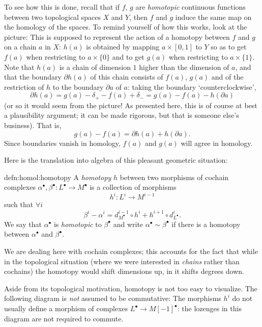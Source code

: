 To see how this is done, recall that if $f$, $g$ are \emph{homotopic}
continuous functions between two topological spaces $X$ and $Y$, then
$f$ and $g$ induce the same map on the homology of the spaces.  To
remind yourself of how this works, look at the picture:
This is supposed to represent the action of a homotopy between $f$ and
$g$ on a chain $a$ in $X$: $h(a)$ is obtained by mapping
$a \times [0,1]$ to $Y$ so as to get $f(a)$ when restricting to
$a \times \{0\}$ and to get $g(a)$ when restricting to
$a \times \{1\}$. Note that $h(a)$ is a chain of dimension $1$ higher
than the dimension of $a$, and that the boundary $\partial h(a)$ of
this chain consists of $f(a)$, $g(a)$ and of the restriction of $h$ to
the boundary $\partial a$ of $a$: taking the boundary
`counterclockwise',
\[
  \partial h(a) = g(a) - \delta_+ - f(a) + \delta_- = g(a) - f(a) -
  h(\partial a)
\]
(or so it would seem from the picture! As presented here, this is of
course at best a plausibility argument; it can be made rigorous, but
that is someone else's business). That is,
\[
  g(a) - f(a) = \partial h(a) + h(\partial a).
\]
Since boundaries vanish in homology, $f(a)$ and $g(a)$ will agree in
homology.

Here is the translation into algebra of this pleasant geometric
situation:

\begin{defn}{}{defn:homol:homotopy}
  A \emph{homotopy} $h$ between two morphisms of cochain complexes
  $\alpha^\bullet, \beta^\bullet : L^\bullet \to M^\bullet$ is a
  collection of morphisms
  \[
    h^i : L^i \to M^{i-1}
  \]
  such that $\forall i$
  \[
    \beta^i - \alpha^i = d^{i-1}_{M^\bullet} \circ h^i + h^{i+1} \circ
    d^i_{L^\bullet}.
  \]
  We say that $\alpha^\bullet$ is \emph{homotopic} to $\beta^\bullet$
  and write $\alpha^\bullet \sim \beta^\bullet$ if there is a homotopy
  between $\alpha^\bullet$ and $\beta^\bullet$.
\end{defn}

We are dealing here with cochain complexes; this accounts for the fact
that while in the topological situation (where we were interested in
\emph{chains} rather than cochains) the homotopy would shift
dimensions up, in  it shifts degrees down.

Aside from its topological motivation, homotopy is not too easy to
visualize. The following diagram is \emph{not} assumed to be
commutative:
The morphisms $h^i$ do not usually define a morphism of complexes
$L^\bullet \to M[-1]^\bullet$: the lozenges in this diagram are not
required to commute.

